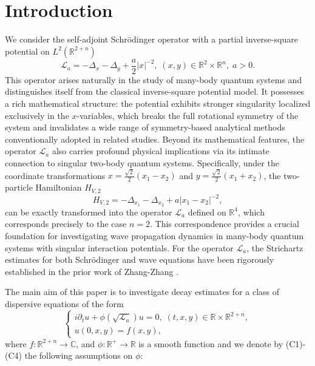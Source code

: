 \documentclass[a4paper,11pt, reqno]{amsart}
\numberwithin{equation}{section}
\theoremstyle{plain}
\theoremstyle{definition}
\theoremstyle{remark}
\begin{document}
	\section{Introduction}
We consider the self-adjoint Schr\"odinger operator with a partial inverse-square potential on $L^2(\mathbb{R}^{2+n})$
\begin{equation*}
\mathcal{L}_a=-\Delta_x-\Delta_y+\frac{a}{2}|x|^{-2}, \;(x,y)\in\mathbb{R}^2\times\mathbb{R}^n,\; a>0.
\end{equation*}
This operator arises naturally in the study of many-body quantum systems and distinguishes itself from the classical inverse-square potential model. It possesses a rich mathematical structure: the potential exhibits stronger singularity localized exclusively in the $x$-variables, which breaks the full rotational symmetry of the system and invalidates a wide range of symmetry-based analytical methods conventionally adopted in related studies. Beyond its mathematical features, the operator $\mathcal{L}_a$ also carries profound physical implications via its intimate connection to singular two-body quantum systems. Specifically, under the coordinate transformations $x=\frac{\sqrt{2}}{2}(x_1-x_2)$ and $y=\frac{\sqrt{2}}{2}(x_1+x_2)$, the two-particle Hamiltonian $H_{V,2}$
\begin{equation*}
H_{V,2}=-\Delta_{x_1}-\Delta_{x_2}+a|x_1-x_2|^{-2},
\end{equation*}
can be exactly transformed into the operator $\mathcal{L}_a$ defined on $\mathbb{R}^4$, which corresponds precisely to the case $n=2$. This correspondence provides a crucial foundation for investigating wave propagation dynamics in many-body quantum systems with singular interaction potentials. For the operator $\mathcal{L}_a$, the Strichartz estimates for both Schr\"odinger and wave equations have been rigorously established in the prior work of Zhang-Zhang \cite{Zhang-Zhang}.

The main aim of this paper is to investigate decay estimates for a class of dispersive equations of the form	\begin{equation}\label{DispersiveEqua}
	\begin{cases}	i\partial_tu+\phi(\sqrt{\mathcal{L}_a}) u=0,\; (t,x,y)\in\mathbb{R}\times\mathbb{R}^{2+n},\\
	u(0,x,y)=f(x,y),
	\end{cases}
	\end{equation}
where $f:\mathbb{R}^{2+n} \to \mathbb C$, and $\phi: \mathbb{R}^+ \to \mathbb{R}$ is a smooth function and we denote by (C1)-(C4) the following assumptions on $\phi$:
\\
\end{document}
